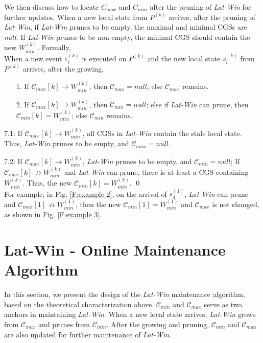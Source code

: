 \documentclass[12pt,journal,letterpaper,compsoc]{IEEEtran}
\begin{document}
We then discuss how to locate $C_{max}$ and $C_{min}$ after the pruning of {\it Lat-Win} for further updates. When a new local state from $P^{(k)}$ arrives, after the pruning of {\it Lat-Win}, if {\it Lat-Win} prunes to be empty, the maximal and minimal CGSs are {\it null}. If {\it Lat-Win} prunes to be non-empty, the minimal CGS should contain the new $W^{(k)}_{min}$. Formally, \\

 When a new event $e^{(k)}_{i}$ is executed on $P^{(k)}$ and the new local state $s^{(k)}_{i}$ from $P^{(k)}$ arrives, after the growing,
\begin{itemize}
    \item[1.] If $\mathcal{C}_{max}[k]\rightarrow W^{(k)}_{min}$, then $\mathcal{C}_{max} = null$; else $\mathcal{C}_{max}$ remains.
    \item[2.] If $\mathcal{C}_{max}[k]\rightarrow W^{(k)}_{min}$, then $\mathcal{C}_{min} = null$; else if {\it Lat-Win} can prune, then $\mathcal{C}_{min}[k] = W^{(k)}_{min}$; else $\mathcal{C}_{min}$ remains.
\end{itemize}


7.1: If $\mathcal{C}_{max}[k]\rightarrow W^{(k)}_{min}$, all CGSs in {\it Lat-Win} contain the stale local state. Thus, {\it Lat-Win} prunes to be empty, and $\mathcal{C}_{max} = null$.

7.2: If $\mathcal{C}_{max}[k]\rightarrow W^{(k)}_{min}$, {\it Lat-Win} prunes to be empty, and $\mathcal{C}_{min} = null$; If $\mathcal{C}_{max}[k]\not\rightarrow W^{(k)}_{min}$ and {\it Lat-Win} can prune, there is at least a CGS containing $W^{(k)}_{min}$. Thus, the new $\mathcal{C}_{min}[k] = W^{(k)}_{min}$. \qed \\

For example, in Fig. \ref{F:example 2}, on the arrival of $s^{(1)}_4$, {\it Lat-Win} can prune and $\mathcal{C}_{max}[1]\not\rightarrow W^{(1)}_{min}$, then the new $\mathcal{C}_{min}[1] = W^{(1)}_{min}$ and $\mathcal{C}_{max}$ is not changed, as shown in Fig. \ref{F:example 3}.

\section{Lat-Win - Online Maintenance Algorithm}
\label{sec:algorithm}

In this section, we present the design of the {\it Lat-Win} maintenance algorithm, based on the theoretical characterization above. $\mathcal{C}_{min}$ and $\mathcal{C}_{max}$ serve as two anchors in maintaining {\it Lat-Win}. When a new local state arrives, {\it Lat-Win} grows from $\mathcal{C}_{max}$ and prunes from $\mathcal{C}_{min}$. After the growing and pruning, $\mathcal{C}_{min}$ and $\mathcal{C}_{max}$ are also updated for further maintenance of {\it Lat-Win}.
\end{document}
